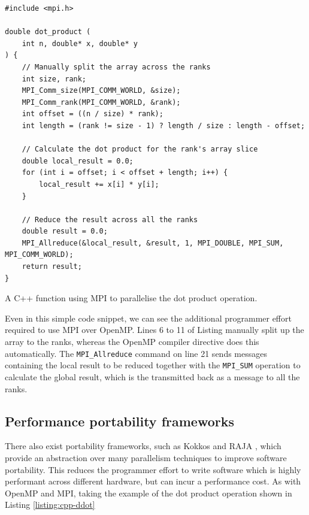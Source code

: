 \begin{listing}[H]
    \begin{verbatim}
#include <mpi.h>

double dot_product (
    int n, double* x, double* y
) {
    // Manually split the array across the ranks
    int size, rank;
    MPI_Comm_size(MPI_COMM_WORLD, &size);
    MPI_Comm_rank(MPI_COMM_WORLD, &rank);
    int offset = ((n / size) * rank);
    int length = (rank != size - 1) ? length / size : length - offset;

    // Calculate the dot product for the rank's array slice
    double local_result = 0.0;
    for (int i = offset; i < offset + length; i++) {
        local_result += x[i] * y[i];
    }

    // Reduce the result across all the ranks
    double result = 0.0;
    MPI_Allreduce(&local_result, &result, 1, MPI_DOUBLE, MPI_SUM, MPI_COMM_WORLD);
    return result;
}
    \end{verbatim}
    \caption{A C++ function using MPI to parallelise the dot product operation.}
    \label{listing:cpp-ddot-mpi}
\end{listing}

Even in this simple code snippet, we can see the additional programmer effort required to use MPI over OpenMP. Lines 6 to 11 of Listing \label{listing:cpp-ddot-mpi} manually split up the array to the ranks, whereas the OpenMP compiler directive does this automatically. The \texttt{MPI_Allreduce} command on line 21 sends messages containing the local result to be reduced together with the \texttt{MPI_SUM} operation to calculate the global result, which is the transmitted back as a message to all the ranks.

\subsection{Performance portability frameworks}
\label{ssec:performance-portability-frameworks}

There also exist portability frameworks, such as Kokkos \cite{edwardsKokkosEnablingPerformance2013} and RAJA \cite{RAJAPortabilitySuite}, which provide an abstraction over many parallelism techniques to improve software portability. This reduces the programmer effort to write software which is highly performant across different hardware, but can incur a performance cost. As with OpenMP and MPI, taking the example of the dot product operation shown in Listing \ref{listing:cpp-ddot}

